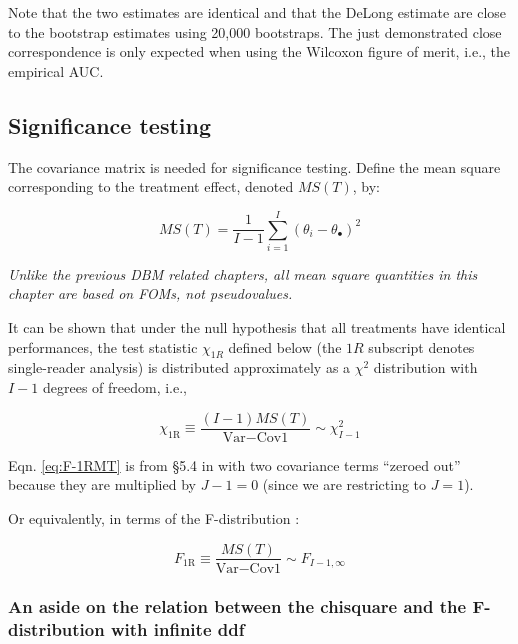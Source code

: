 \documentclass[
]{book}
\begin{document}
Note that the two estimates are identical and that the DeLong estimate are close to the bootstrap estimates using 20,000 bootstraps. The just demonstrated close correspondence is only expected when using the Wilcoxon figure of merit, i.e., the empirical AUC.

\hypertarget{SignificanceTesting1ROR}{%
\subsection{Significance testing}\label{SignificanceTesting1ROR}}

The covariance matrix is needed for significance testing. Define the mean square corresponding to the treatment effect, denoted \(MS(T)\), by:

\begin{equation}
MS(T)=\frac{1}{I-1}\sum_{i=1}^{I}(\theta_i-\theta_\bullet)^2
\label{eq:DefinitionMST}
\end{equation}

\emph{Unlike the previous DBM related chapters, all mean square quantities in this chapter are based on FOMs, not pseudovalues.}

It can be shown that under the null hypothesis that all treatments have identical performances, the test statistic \(\chi_{1R}\) defined below (the \(1R\) subscript denotes single-reader analysis) is distributed approximately as a \(\chi^2\) distribution with \(I-1\) degrees of freedom, i.e.,

\begin{equation}
\chi_{\text{1R}} \equiv \frac{(I-1)MS(T)}{\text{Var}-\text{Cov1}} \sim \chi_{I-1}^{2}
\label{eq:F-1RMT}
\end{equation}

Eqn. \eqref{eq:F-1RMT} is from §5.4 in \citep{RN1865} with two covariance terms ``zeroed out'' because they are multiplied by \(J-1 = 0\) (since we are restricting to \(J=1\)).

Or equivalently, in terms of the F-distribution \citep{RN1772}:

\begin{equation}
F_{\text{1R}} \equiv \frac{MS(T)}{\text{Var}-\text{Cov1}} \sim F_{I-1, \infty}
\label{eq:DefF-1RMT}
\end{equation}

\hypertarget{an-aside-on-the-relation-between-the-chisquare-and-the-f-distribution-with-infinite-ddf}{%
\subsubsection{An aside on the relation between the chisquare and the F-distribution with infinite ddf}\label{an-aside-on-the-relation-between-the-chisquare-and-the-f-distribution-with-infinite-ddf}}
\end{document}
